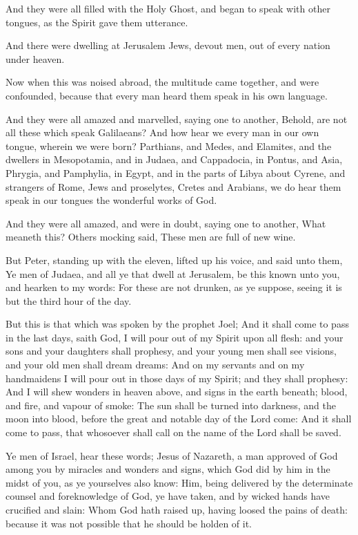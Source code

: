 \verse And they were all filled with the Holy Ghost, and began to speak with other tongues, as the Spirit gave them utterance.

\verse And there were dwelling at Jerusalem Jews, devout men, out of every nation under heaven.

\verse Now when this was noised abroad, the multitude came together, and were confounded, because that every man heard them speak in his own language.

\verse And they were all amazed and marvelled, saying one to another, Behold, are not all these which speak Galilaeans?  \verse And how hear we every man in our own tongue, wherein we were born?  \verse Parthians, and Medes, and Elamites, and the dwellers in Mesopotamia, and in Judaea, and Cappadocia, in Pontus, and Asia, \verse Phrygia, and Pamphylia, in Egypt, and in the parts of Libya about Cyrene, and strangers of Rome, Jews and proselytes, \verse Cretes and Arabians, we do hear them speak in our tongues the wonderful works of God.

\verse And they were all amazed, and were in doubt, saying one to another, What meaneth this?  \verse Others mocking said, These men are full of new wine.

\verse But Peter, standing up with the eleven, lifted up his voice, and said unto them, Ye men of Judaea, and all ye that dwell at Jerusalem, be this known unto you, and hearken to my words: \verse For these are not drunken, as ye suppose, seeing it is but the third hour of the day.

\verse But this is that which was spoken by the prophet Joel; \verse And it shall come to pass in the last days, saith God, I will pour out of my Spirit upon all flesh: and your sons and your daughters shall prophesy, and your young men shall see visions, and your old men shall dream dreams: \verse And on my servants and on my handmaidens I will pour out in those days of my Spirit; and they shall prophesy: \verse And I will shew wonders in heaven above, and signs in the earth beneath; blood, and fire, and vapour of smoke: \verse The sun shall be turned into darkness, and the moon into blood, before the great and notable day of the Lord come: \verse And it shall come to pass, that whosoever shall call on the name of the Lord shall be saved.

\verse Ye men of Israel, hear these words; Jesus of Nazareth, a man approved of God among you by miracles and wonders and signs, which God did by him in the midst of you, as ye yourselves also know: \verse Him, being delivered by the determinate counsel and foreknowledge of God, ye have taken, and by wicked hands have crucified and slain: \verse Whom God hath raised up, having loosed the pains of death: because it was not possible that he should be holden of it.

